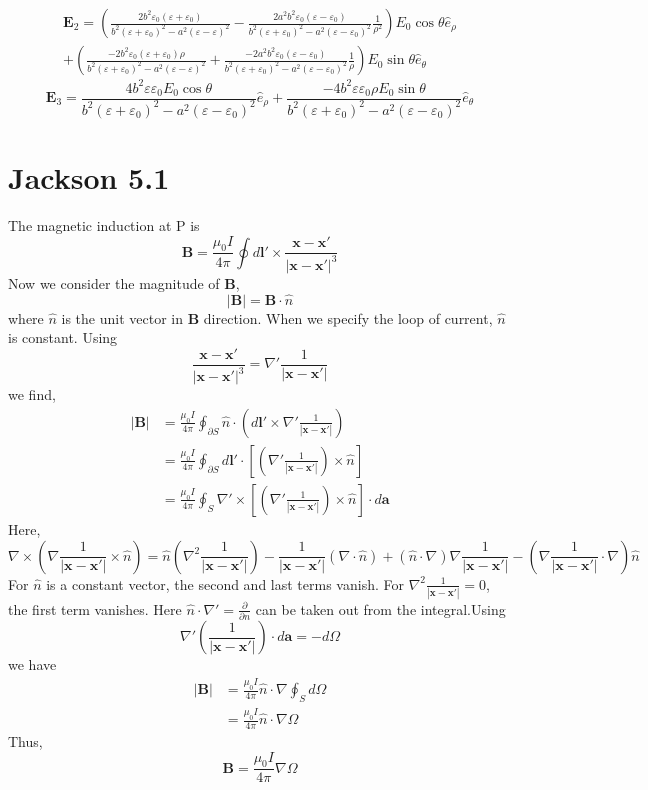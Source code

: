 \documentclass{article}
\newcommand{\pd}[2]{\frac{\partial#1}{\partial#2}}
\begin{document}
\begin{align*}
\bm E_2=(\frac{2b^2\varepsilon_0(\varepsilon+\varepsilon_0)}{b^2(\varepsilon+\varepsilon_0)^2-a^2(\varepsilon-\varepsilon)^2}-\frac{2a^2b^2\varepsilon_0(\varepsilon-\varepsilon_0)}{b^2(\varepsilon+\varepsilon_0)^2-a^2(\varepsilon-\varepsilon_0)^2}\frac{1}{\rho^2})E_0\cos\theta\hat e_\rho\\+(\frac{-2b^2\varepsilon_0(\varepsilon+\varepsilon_0)\rho}{b^2(\varepsilon+\varepsilon_0)^2-a^2(\varepsilon-\varepsilon)^2}+\frac{-2a^2b^2\varepsilon_0(\varepsilon-\varepsilon_0)}{b^2(\varepsilon+\varepsilon_0)^2-a^2(\varepsilon-\varepsilon_0)^2}\frac{1}{\rho})E_0\sin\theta\hat e_\theta
\end{align*}
\[ \bm E_3=\frac{4b^2\varepsilon\varepsilon_0 E_0\cos\theta}{b^2(\varepsilon+\varepsilon_0)^2-a^2(\varepsilon-\varepsilon_0)^2}\hat e_\rho+\frac{-4b^2\varepsilon\varepsilon_0\rho E_0\sin\theta}{b^2(\varepsilon+\varepsilon_0)^2-a^2(\varepsilon-\varepsilon_0)^2}\hat e_\theta\]
\pagebreak

\section*{Jackson 5.1}

The magnetic induction at P is
\[ \bm B=\frac{\mu_0I}{4\pi}\oint d\bm l'\times\frac{\bm x-\bm x'}{|\bm x-\bm x'|^3} \]
Now we consider the magnitude of $\bm B$,
\[ |\bm B|=\bm B\cdot\hat n \]
where $\hat n$ is the unit vector in $\bm B$ direction. When we specify the loop of current, $\hat n$ is constant. Using
\[ \frac{\bm x-\bm x'}{|\bm x-\bm x'|^3}=\nabla'\frac{1}{|\bm x-\bm x'|} \]
we find,
\begin{align*}
  |\bm B|&=\frac{\mu_0I}{4\pi}\oint_{\partial S}\hat n\cdot(d\bm l'\times\nabla'\frac{1}{|\bm x-\bm x'|})\\
         &=\frac{\mu_0I}{4\pi}\oint_{\partial S} d\bm l'\cdot[(\nabla'\frac{1}{|\bm x-\bm x'|})\times\hat n]\\
         &=\frac{\mu_0I}{4\pi}\oint_{S}\nabla'\times[(\nabla'\frac{1}{|\bm x-\bm x'|})\times\hat n]\cdot d\bm a
\end{align*}
Here,
\[ \nabla\times(\nabla\frac{1}{|\bm x-\bm x'|}\times\hat n)=\hat n(\nabla^2\frac{1}{|\bm x-\bm x'|})-\frac{1}{|\bm x-\bm x'|}(\nabla\cdot\hat n)+(\hat n\cdot\nabla)\nabla\frac{1}{|\bm x-\bm x'|}-(\nabla\frac{1}{|\bm x-\bm x'|}\cdot\nabla)\hat n \]
For $\hat n$ is a constant vector, the second and last terms vanish. For $\nabla^2\frac{1}{|\bm x-\bm x'|}=0$, the first term vanishes. Here $\hat n\cdot\nabla'=\pd{}{n}$ can be taken out from the integral.Using
\[ \nabla'(\frac{1}{|\bm x-\bm x'|})\cdot d\bm a=-d\Omega \]
we have
\begin{align*}
  |\bm B|&=\frac{\mu_0I}{4\pi}\hat n\cdot\nabla\oint_Sd\Omega\\
         &=\frac{\mu_0I}{4\pi}\hat n\cdot\nabla\Omega
\end{align*}
Thus,
\[\boxed{\bm B=\frac{\mu_0I}{4\pi}\nabla\Omega}\]
\pagebreak
\end{document}
